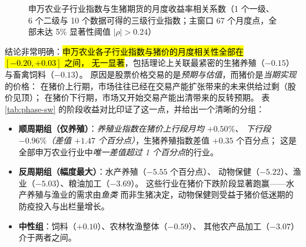 \begin{figure}[htbp]
\centering
{}
\caption{申万农业子行业指数与生猪期货的月度收益率相关系数（1 个一级、6 个二级与 10 个数据可得的三级行业指数；主窗口 67 个月度点，全部未达 5\% 显著性阈值 $|\rho|>0.24$）}
\label{fig:sw-corr}
\end{figure}



结论非常明确：\hl{申万农业各子行业指数与猪价的月度相关性全部在 $[-0.20,+0.03]$ 之间，
无一显著}，包括理论上关联最紧密的生猪养殖（$-0.15$）与畜禽饲料（$-0.13$）。
原因是股票价格交易的是\emph{预期}\emph{与估值}，而猪价是\emph{当期实现}的价格：
在猪价上行期，市场往往已经在交易产能扩张带来的未来供给过剩（股价见顶）；
在猪价下行期，市场又开始交易产能出清带来的反转预期。
表 \ref{tab:phase-sw} 的阶段收益对比印证了这一点，并给出一个清晰的分组：

\begin{itemize}
  \item \textbf{顺周期组（仅养殖）}：\emph{养殖业指数在猪价上行段月均 $+0.50\%$、
  下行段 $-0.96\%$（差值 $+1.47$ 个百分点）}，生猪养殖指数差值 $+0.35$ 个百分点；
  这是全部申万农业行业中\emph{唯一差值超过 1 个百分点}的行业。
  \item \textbf{反周期组（幅度最大）}：水产养殖（$-5.55$ 个百分点）、
  动物保健（$-5.22$）、渔业（$-5.03$）、粮油加工（$-3.69$）。
  这些行业在猪价下跌阶段显著跑赢——水产养殖与渔业的需求由\emph{鱼类}
  而非生猪决定，动物保健则受益于猪价低迷期的防疫投入与出栏量增长。
  \item \textbf{中性组}：饲料（$+0.10$）、农林牧渔整体（$-0.59$）、
  其他农产品加工（$-3.07$）介于两者之间。
\end{itemize}

